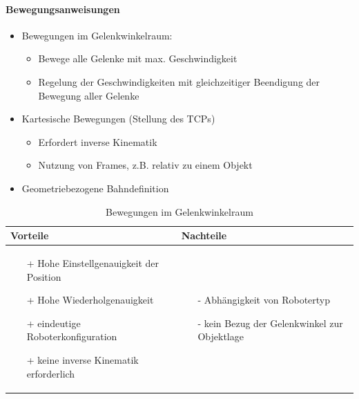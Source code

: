\paragraph{Bewegungsanweisungen}
\begin{itemize}
\item Bewegungen im Gelenkwinkelraum:
\begin{itemize}
\item Bewege alle Gelenke mit max. Geschwindigkeit
\item Regelung der Geschwindigkeiten mit gleichzeitiger Beendigung der Bewegung aller Gelenke
\end{itemize}
\item Kartesische Bewegungen (Stellung des TCPs)
\begin{itemize}
\item Erfordert inverse Kinematik
\item Nutzung von Frames, z.B. relativ zu einem Objekt
\end{itemize}
\item Geometriebezogene Bahndefinition
\end{itemize}
\begin{table}[hbt]
\centering
\begin{tabular}{|p{7.5cm}|p{7.5cm}|}
\hline
Vorteile & Nachteile\\
\hline
\vspace{-5mm}
\begin{itemize}
\setlength\itemsep{0em}
\item[+] Hohe Einstellgenauigkeit der Position
\item[+] Hohe Wiederholgenauigkeit
\item[+] eindeutige Roboterkonfiguration
\item[+] keine inverse Kinematik erforderlich
\end{itemize}
 &
 \vspace{-5mm}
\begin{itemize}
\setlength\itemsep{0em}
\item[-] Abhängigkeit von Robotertyp
\item[-] kein Bezug der Gelenkwinkel zur Objektlage
\end{itemize}\\
\hline
\end{tabular}
\caption{Bewegungen im Gelenkwinkelraum}
\label{tab:bew}
\end{table}
